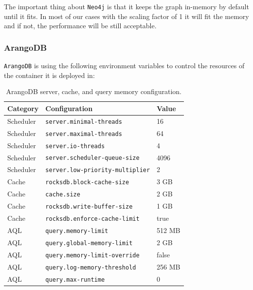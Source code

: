 \documentclass[11pt,a4paper]{article}
\begin{document}
The important thing about \texttt{Neo4j} is that it keeps the graph in-memory by default until it fits. In most of our cases with the scaling factor of 1 it will fit the memory and if not, the performance will be still acceptable.

\subsubsection{ArangoDB}

\texttt{ArangoDB} is using the following environment variables to control the resources of the container it is deployed in:

\begin{table}[htbp]
    \centering
    \caption{ArangoDB server, cache, and query memory configuration.}
    \label{tab:arangodb-memory-config}
    \begin{tabular}{lll}
        \hline
        \textbf{Category} & \textbf{Configuration} & \textbf{Value} \\
        \hline
        Scheduler & \texttt{server.minimal-threads}              & 16 \\
        Scheduler & \texttt{server.maximal-threads}              & 64 \\
        Scheduler & \texttt{server.io-threads}                   & 4 \\
        Scheduler & \texttt{server.scheduler-queue-size}         & 4096 \\
        Scheduler & \texttt{server.low-priority-multiplier}      & 2 \\
        \hline
        Cache & \texttt{rocksdb.block-cache-size}                & 3 GB \\
        Cache & \texttt{cache.size}                              & 2 GB \\
        Cache & \texttt{rocksdb.write-buffer-size}               & 1 GB \\
        Cache & \texttt{rocksdb.enforce-cache-limit}             & true \\
        \hline
        AQL & \texttt{query.memory-limit}                        & 512 MB \\
        AQL & \texttt{query.global-memory-limit}                 & 2 GB \\
        AQL & \texttt{query.memory-limit-override}               & false \\
        AQL & \texttt{query.log-memory-threshold}                & 256 MB \\
        AQL & \texttt{query.max-runtime}                         & 0 \\
        \hline
    \end{tabular}
\end{table}
\end{document}
